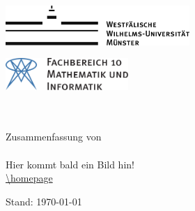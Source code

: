 \begin{titlepage}
\pagestyle{empty}
\begin{center}
\begin{minipage}{0.4\textwidth}
\begin{flushleft}
\includegraphics[height=1.5cm,keepaspectratio]{../!config/Bilder/wwulogo.pdf}
\end{flushleft}
\end{minipage}
\hfill
\begin{minipage}{0.4\textwidth}
\begin{flushright}
\vspace*{0.3cm}
\includegraphics[height=1.2cm,keepaspectratio]{../!config/Bilder/fb10logo.pdf} \
\end{flushright}
\end{minipage}

\vspace*{2cm}
\textbf{\Huge{\fach}} \\
\vspace{0.2cm} 
\textbf{{\LARGE \untertitel}} \\
\vspace{0.6cm}
\LARGE{Zusammenfassung von \verfasser} \\
\vspace{0.6cm}
\LARGE{\semester} \\
\vspace*{1.5cm}
Hier kommt bald ein Bild hin! \\
\vspace*{1cm}
\footnotesize{\url{\homepage}} \\

\vfill
\vspace*{1.5cm}
\begin{flushright}
{\footnotesize Stand: \today}
\end{flushright}
\end{center}
\end{titlepage}
